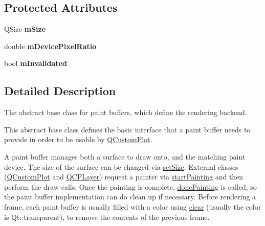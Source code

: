 \subsection*{Protected Attributes}
\begin{DoxyCompactItemize}
\item 
\mbox{\label{class_q_c_p_abstract_paint_buffer_ae246c426222bfa18d5e8797fab73e3ce}} 
Q\+Size {\bfseries m\+Size}
\item 
\mbox{\label{class_q_c_p_abstract_paint_buffer_a33c1fd784478441fcff9ebf3d69af5b2}} 
double {\bfseries m\+Device\+Pixel\+Ratio}
\item 
\mbox{\label{class_q_c_p_abstract_paint_buffer_a3bc49cc9cf9daaca3a60977f010c08c9}} 
bool {\bfseries m\+Invalidated}
\end{DoxyCompactItemize}


\subsection{Detailed Description}
The abstract base class for paint buffers, which define the rendering backend. 

This abstract base class defines the basic interface that a paint buffer needs to provide in order to be usable by \hyperlink{class_q_custom_plot}{Q\+Custom\+Plot}.

A paint buffer manages both a surface to draw onto, and the matching paint device. The size of the surface can be changed via \hyperlink{class_q_c_p_abstract_paint_buffer_a8b68c3cd36533f1a4a23b5ce8cd66f01}{set\+Size}. External classes (\hyperlink{class_q_custom_plot}{Q\+Custom\+Plot} and \hyperlink{class_q_c_p_layer}{Q\+C\+P\+Layer}) request a painter via \hyperlink{class_q_c_p_abstract_paint_buffer_a9e9f29b19c033cf02fb96f1a148463f3}{start\+Painting} and then perform the draw calls. Once the painting is complete, \hyperlink{class_q_c_p_abstract_paint_buffer_a41b0dc6e7744f19fae09f8532c207dc1}{done\+Painting} is called, so the paint buffer implementation can do clean up if necessary. Before rendering a frame, each paint buffer is usually filled with a color using \hyperlink{class_q_c_p_abstract_paint_buffer_a9e253f4541dfc01992b77e8830bd7722}{clear} (usually the color is {\ttfamily Qt\+::transparent}), to remove the contents of the previous frame.


